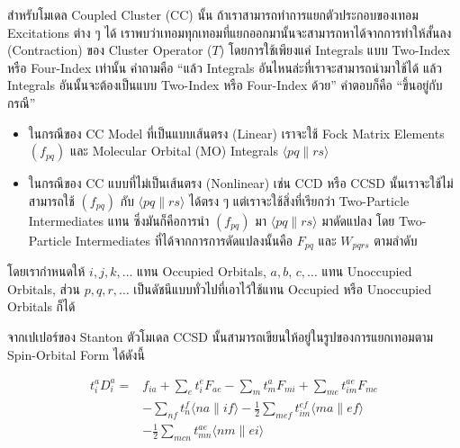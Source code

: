 สำหรับโมเดล Coupled Cluster (CC) นั้น ถ้าเราสามารถทำการแยกตัวประกอบของเทอม Excitations ต่าง ๆ ได้ เราพบว่าเทอมทุกเทอมที่แยกออกมานั้นจะสามารถหาได้จากการทำให้สั้นลง (Contraction) ของ Cluster Operator ($T$) โดยการใช้เพียงแค่ Integrals แบบ Two-Index หรือ Four-Index เท่านั้น คำถามคือ \enquote{แล้ว Integrals อันไหนล่ะที่เราจะสามารถนำมาใช้ได้ แล้ว Integrals อันนั้นจะต้องเป็นแบบ Two-Index หรือ Four-Index ด้วย} คำตอบก็คือ \enquote{ขึ้นอยู่กับกรณี}
%
\begin{itemize}[topsep=0pt,noitemsep]
  \setlength\itemsep{0.5em}
  \item ในกรณีของ CC Model ที่เป็นแบบเส้นตรง (Linear) เราจะใช้ Fock Matrix Elements $\left(f_{p q}\right)$ และ Molecular Orbital (MO) Integrals $\langle p q \| r s\rangle$

  \item ในกรณีของ CC แบบที่ไม่เป็นเส้นตรง (Nonlinear) เช่น CCD หรือ CCSD นั้นเราจะใช้ไม่สามารถใช้ $\left(f_{p q}\right)$ กับ $\langle p q \| r s\rangle$ ได้ตรง ๆ แต่เราจะใช้สิ่งที่เรียกว่า Two-Particle Intermediates แทน ซึ่งมันก็คือการนำ $\left(f_{p q}\right)$ มา $\langle p q \| r s\rangle$ มาดัดแปลง โดย Two-Particle Intermediates ที่ได้จากการการดัดแปลงนั้นคือ $F_{p q}$ และ $W_{p q r s}$ ตามลำดับ
\end{itemize}
%
โดยเรากำหนดให้ $i, j, k, \ldots$ แทน Occupied Orbitals, $a, b$, $c, \ldots$ แทน Unoccupied Orbitals, ส่วน $p, q, r, \ldots$ เป็นดัชนีแบบทั่วไปที่เอาไว้ใช้แทน Occupied หรือ Unoccupied Orbitals ก็ได้

จากเปเปอร์ของ Stanton ตัวโมเดล CCSD นั้นสามารถเขียนให้อยู่ในรูปของการแยกเทอมตาม Spin-Orbital Form ได้ดังนี้

\noindent {}

\begin{equation}
  \label{eq:singles_cluster_operator}
  \begin{aligned}
    t_i^a D_i^a
    =
     & f_{i a} + \sum_e t_i^e F_{a e} - \sum_m t_m^a F_{m i}
    + \sum_{m e} t_{i m}^{a e} F_{m e}                                                                               \\
     & - \sum_{n f} t_n^f\langle n a \| i f\rangle - \frac{1}{2} \sum_{m e f} t_{i m}^{e f}\langle m a \| e f\rangle \\
     & - \frac{1}{2} \sum_{m c n} t_{m n}^{a e}\langle n m \| e i\rangle
  \end{aligned}
\end{equation}

\noindent {}

